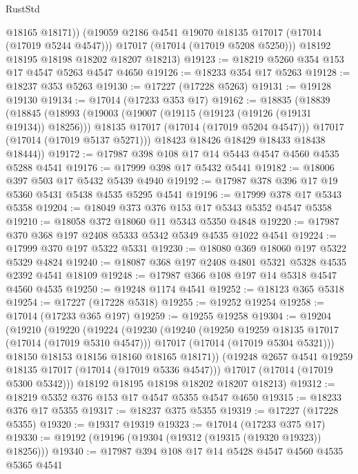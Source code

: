 \begin{lexlean}{RustStd}
\begin{coremodule}
{\begin{coremodule}
{{{{{{{{{{{{{{{{{{{{{{{{{{{{{{{{{{{{{{{{{{{{{{{{{{{{{{{            @18165
            @18171))
        (@19059 @2186 @4541 @19070 @18135 @17017 (@17014 (@17019 @5244 @4547)))
        @17017
        (@17014 (@17019 @5208 @5250)))
      @18192
      @18195
      @18198
      @18202
      @18207
      @18213)
@19123 := @18219 @5260 @354 @153 @17 @4547 @5263 @4547 @4650
@19126 := @18233 @354 @17 @5263
@19128 := @18237 @353 @5263
@19130 := @17227 (@17228 @5263)
@19131 := @19128 @19130
@19134 := @17014 (@17233 @353 @17)
@19162 := @18835
    (@18839
      (@18845
        (@18993
          (@19003
            (@19007 (@19115 (@19123 (@19126 (@19131 @19134)) @18256)))
            @18135
            @17017
            (@17014 (@17019 @5204 @4547)))
          @17017
          (@17014 (@17019 @5137 @5271)))
        @18423
        @18426
        @18429
        @18433
        @18438
        @18444))
@19172 := @17987 @398 @108 @17 @14 @5443 @4547 @4560 @4535 @5288 @4541
@19176 := @17999 @398 @17 @5432 @5441
@19182 := @18006 @397 @503 @17 @5432 @5439 @4940
@19192 := @17987 @378 @396 @17 @19 @5360 @5431 @5438 @4535 @5295 @4541
@19196 := @17999 @378 @17 @5343 @5358
@19204 := @18049 @373 @376 @153 @17 @5343 @5352 @4547 @5358
@19210 := @18058 @372 @18060 @11 @5343 @5350 @4848
@19220 := @17987 @370 @368 @197 @2408 @5333 @5342 @5349 @4535 @1022 @4541
@19224 := @17999 @370 @197 @5322 @5331
@19230 := @18080 @369 @18060 @197 @5322 @5329 @4824
@19240 := @18087 @368 @197 @2408 @4801 @5321 @5328 @4535 @2392 @4541 @18109
@19248 := @17987 @366 @108 @197 @14 @5318 @4547 @4560 @4535
@19250 := @19248 @1174 @4541
@19252 := @18123 @365 @5318
@19254 := @17227 (@17228 @5318)
@19255 := @19252 @19254
@19258 := @17014 (@17233 @365 @197)
@19259 := @19255 @19258
@19304 := @19204
    (@19210
      (@19220
        (@19224
          (@19230
            (@19240
              (@19250 @19259 @18135 @17017 (@17014 (@17019 @5310 @4547)))
              @17017
              (@17014 (@17019 @5304 @5321)))
            @18150
            @18153
            @18156
            @18160
            @18165
            @18171))
        (@19248 @2657 @4541 @19259 @18135 @17017 (@17014 (@17019 @5336 @4547)))
        @17017
        (@17014 (@17019 @5300 @5342)))
      @18192
      @18195
      @18198
      @18202
      @18207
      @18213)
@19312 := @18219 @5352 @376 @153 @17 @4547 @5355 @4547 @4650
@19315 := @18233 @376 @17 @5355
@19317 := @18237 @375 @5355
@19319 := @17227 (@17228 @5355)
@19320 := @19317 @19319
@19323 := @17014 (@17233 @375 @17)
@19330 := @19192 (@19196 (@19304 (@19312 (@19315 (@19320 @19323)) @18256)))
@19340 := @17987 @394 @108 @17 @14 @5428 @4547 @4560 @4535 @5365 @4541
}}}}}}}}}}}}}}}}}}}}}}}}}}}}}}}}}}}}}}}}}}}}}}}}}}}}}}}
\end{coremodule}}
\end{coremodule}
\end{lexlean}
